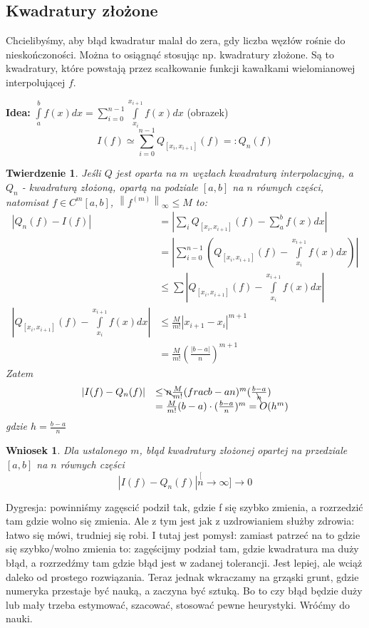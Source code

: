 \documentclass[hidelinks,a4paper,fleqn,oneside]{book}
\newcommand{\ra}{\rightarrow}
\newcommand{\norm}[1]{\left\lVert#1\right\rVert}
\newtheorem{wniosek}{Wniosek}
\newtheorem{twierdz}{Twierdzenie}
\begin{document}
\subsection{Kwadratury złożone}

Chcielibyśmy, aby błąd kwadratur malał do zera, gdy liczba węzłów rośnie do nieskończoności. Można to osiągnąć stosując np. kwadratury złożone. Są to kwadratury, które powstają przez scałkowanie funkcji kawałkami wielomianowej interpolującej $f$.

\textbf{Idea:} $\int\limits_a^b f(x)dx = \sum_{i=0}^{n-1} \int\limits_{x_i}^{x_{i+1}} f(x)dx$
(obrazek)
\[
	I(f) \simeq \sum\limits_{i=0}^{n-1} Q_{[x_i, x_{i+1}]}(f) =: Q_n(f)
\]

\begin{twierdz} Jeśli $Q$ jest oparta na $m$ węzłach kwadraturą interpolacyjną, a $Q_n$ - kwadraturą złożoną, opartą na podziale $[a, b]$ na $n$ równych części, natomisat $f \in C^m[a, b]$, $\norm{f^{(m)}}_\infty \leq M$ to:
\[
\begin{array}{rl}
	|Q_n(f) - I(f)| & = |\sum_i Q_{[x_i, x_{i+1}]}(f) - \sum\limits_a^b f(x)dx| \\
	& = |\sum\limits_{i=0}^{n-1}\left(Q_{[x_i, x_{i+1}]}(f) - \int\limits_{x_i}^{x_{i+1}} f(x)dx\right)| \\
	& \leq \sum |Q_{[x_i, x_{i+1}]}(f) - \int\limits_{x_i}^{x_{i+1}} f(x)dx|\\
	|Q_{[x_i, x_{i+1}]}(f) - \int\limits_{x_i}^{x_{i+1}} f(x)dx|  & \leq \frac{M}{m!}|x_{i+1}-x_i|^{m+1} \\
	& = \frac{M}{m!}(\frac{|b-a|}{n})^{m+1}
\end{array}
\]
Zatem
\[
\begin{array}{rl}
	|I(f) - Q_n(f)| & \leq \bcancel{n}\frac{M}{m!}(frac{b-a}{n})^m(\frac{b-a}{\bcancel{n}}) \\
	& = \frac{M}{m!}(b-a)\cdot(\frac{b-a}{n})^m = O(h^m)
\end{array}
\]
gdzie $h = \frac{b-a}{n}$
\end{twierdz}

\begin{wniosek}
	Dla ustalonego $m$, błąd kwadratury złożonej opartej na przedziale $[a, b]$ na $n$ równych części
	\[
		|I(f) - Q_n(f)| \stackrel[n \ra \infty]{}{\longrightarrow} 0
	\]
\end{wniosek}

Dygresja: powinniśmy zagęscić podził tak, gdzie f się szybko zmienia, a rozrzedzić tam gdzie wolno się zmienia. Ale z tym jest jak z uzdrowianiem służby zdrowia: łatwo się mówi, trudniej się robi. I tutaj jest pomysł: zamiast patrzeć na to gdzie się szybko/wolno zmienia to: zagęścijmy podział tam, gdzie kwadratura ma duży błąd, a rozrzedźmy tam gdzie błąd jest w zadanej tolerancji. Jest lepiej, ale wciąż daleko od prostego rozwiązania. Teraz jednak wkraczamy na grząski grunt, gdzie numeryka przestaje być nauką, a zaczyna być sztuką. Bo to czy błąd będzie duży lub mały trzeba estymować, szacować, stosować pewne heurystyki. Wróćmy do nauki.
\end{document}
